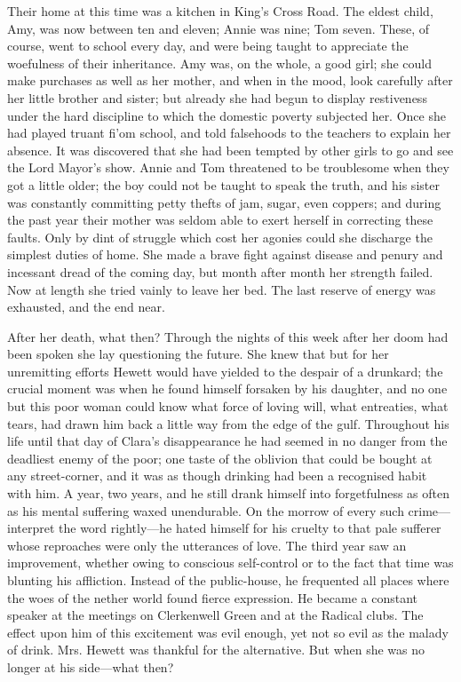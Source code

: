 Their home at this time was a kitchen in King's Cross Road. The eldest
child, Amy, was now between ten and eleven; Annie was {}nine; Tom seven.
These, of course, went to school every day, and were being taught to
appreciate the woefulness of their inheritance. Amy was, on the whole, a
good girl; she could make purchases as well as her mother, and when in
the mood, look carefully after her little brother and sister; but
already she had begun to display restiveness under the hard discipline
to which the domestic poverty subjected her. Once she had played truant
fi'om school, and told falsehoods to the teachers to explain her
absence. It was discovered that she had been tempted by other girls to
go and see the Lord Mayor's show. Annie and Tom threatened to be
troublesome when they got a little older; the boy could not be taught to
speak the truth, and his sister was constantly committing petty thefts
of jam, sugar, even coppers; and during the past year their mother was
seldom able to exert herself in correcting these faults. Only by dint of
struggle which cost her agonies could she discharge the simplest duties
of home. She made a brave fight against disease and penury {}and
incessant dread of the coming day, but month after month her strength
failed. Now at length she tried vainly to leave her bed. The last
reserve of energy was exhausted, and the end near.

After her death, what then? Through the nights of this week after her
doom had been spoken she lay questioning the future. She knew that but
for her unremitting efforts Hewett would have yielded to the despair of
a drunkard; the crucial moment was when he found himself forsaken by his
daughter, and no one but this poor woman could know what force of loving
will, what entreaties, what tears, had drawn him back a little way from
the edge of the gulf. Throughout his life until that day of Clara's
disappearance he had seemed in no danger from the deadliest enemy of the
poor; one taste of the oblivion that could be bought at any
street-corner, and it was as though drinking had been a recognised habit
with him. A year, two years, and he still drank himself into
forgetfulness as often as his mental suffering waxed {}unendurable. On
the morrow of every such crime---interpret the word rightly---he hated
himself for his cruelty to that pale sufferer whose reproaches were only
the utterances of love. The third year saw an improvement, whether owing
to conscious self-control or to the fact that time was blunting his
affliction. Instead of the public-house, he frequented all places where
the woes of the nether world found fierce expression. He became a
constant speaker at the meetings on Clerkenwell Green and at the Radical
clubs. The effect upon him of this excitement was evil enough, yet not
so evil as the malady of drink. Mrs. Hewett was thankful for the
alternative. But when she was no longer at his side---what then?

